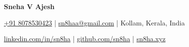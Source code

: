 \begin{center}
    {\Huge\textbf{Sneha V Ajesh}}
\end{center}
\vspace{-6mm}

\begin{center}
    \small{
    \socialicon{\faPhone} \href{tel:+918078530423}{+91 8078530423} |
    \socialicon{\faEnvelope} \href{mailto:sn8haa@gmail.com}{sn8haa@gmail.com} |
    \socialicon{\faMapMarker*} Kollam, Kerala, India
    }
\end{center}
\vspace{-6mm}

\begin{center}
    \small{
    \socialicon{\faLinkedin} \href{https://linkedin.com/in/sn8ha}{linkedin.com/in/sn8ha} |
    \socialicon{\faGithub} \href{https://github.com/sn8ha}{github.com/sn8ha} |
    \socialicon{\faGlobe} \href{https://sn8ha.xyz/}{sn8ha.xyz}
    }
\end{center}
\vspace{-4mm}